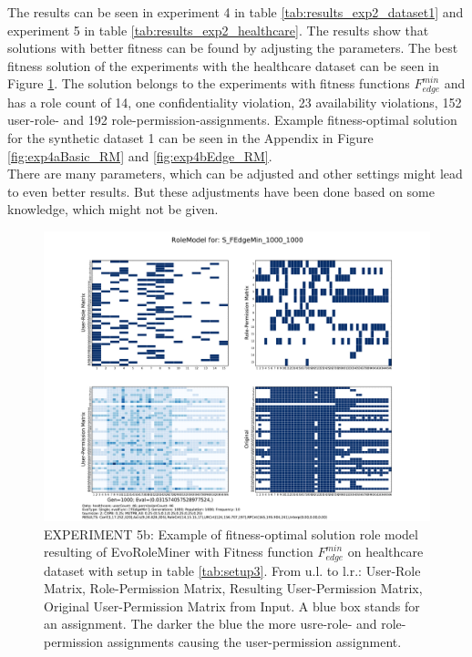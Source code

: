 The results can be seen in experiment 4 in table \ref{tab:results_exp2_dataset1} and experiment 5 in table \ref{tab:results_exp2_healthcare}. The results show that solutions with better fitness can be found by adjusting the parameters. The best fitness solution of the experiments with the healthcare dataset can be seen in Figure \ref{fig:exp5edge_RM}. The solution belongs to the experiments with fitness functions $F_{edge}^{min}$ and has a role count of 14, one confidentiality violation, 23 availability violations, 152 user-role- and 192 role-permission-assignments. Example fitness-optimal solution for the synthetic dataset 1 can be seen in the Appendix in Figure \ref{fig:exp4aBasic_RM} and \ref{fig:exp4bEdge_RM}.\\
There are many parameters, which can be adjusted and other settings might lead to even better results. But these adjustments have been done based on some knowledge, which might not be given.

\begin{figure}[H]
    \centering
    \includegraphics[scale=0.37, trim=4cm 2cm 4cm 2cm, clip=true]{./Figures/exp5edge_RM}
    \caption{EXPERIMENT 5b: Example of fitness-optimal solution role model resulting of EvoRoleMiner with Fitness function $F_{edge}^{min}$ on healthcare dataset with setup in table \ref{tab:setup3}. From u.l. to l.r.: User-Role Matrix, Role-Permission Matrix, Resulting User-Permission Matrix, Original User-Permission Matrix from Input. A blue box stands for an assignment. The darker the blue the more usre-role- and role-permission assignments causing the user-permission assignment.}
    \label{fig:exp5edge_RM}
\end{figure}